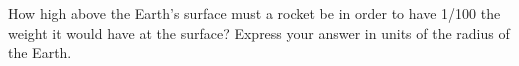  How high above the Earth's surface must a rocket be in
order to have 1/100 the weight it would have at the surface?
Express your answer in units of the radius of the Earth.\answercheck
